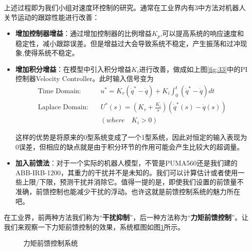 上述过程即为我们小组对速度环控制的研究。通常在工业界内有3中方法对机器人关节运动的跟踪性能进行改善：

\begin{itemize}
    \item \textbf{增加控制器增益}：通过增加控制器的比例增益$K_p$,可以提高系统的响应速度和稳定性，减小跟踪误差。但是增益过大会导致系统不稳定，产生振荡和过冲现象,使得系统不稳定。
    \item \textbf{增加积分增益}：在模型中引入积分增益$K_i$进行改善，做成如上图\ref{fig:33}中的PI控制器Velocity Controller。此时输入信号变为
    \begin{equation}
        \begin{aligned}
           \text{Time Domain:}\quad &u^*=K_v(\dot{q}^*-\dot{q})+K_i\int_{0}^{t}(\dot{q}^*-\dot{q})dt\\
           \text{Laplace Domain:}\quad  &U^*(s)=(K_v+\frac{K_i}{s})(\dot{q}^*(s)-\dot{q}(s))\\
           & (where \quad K_i>0)
        \end{aligned}
    \end{equation}

    这样的优势是将原来的0型系统变成了一个1型系统，因此对恒定的输入表现为0误差，但相应的缺点就是由于积分环节的作用可能会产生比较大的超调量。
    \item \textbf{加入前馈法}：对于一个实际的机器人模型，不管是PUMA560还是我们建的ABB-IRB-1200，其重力的干扰并不是未知的。我们可以计算估计或者使用一些上限/下限，预测干扰并消除它。值得一提的是，即使我们设置的前馈量不准确，前馈控制也能减少干扰的浮动。\textcolor{cherry}{也许这就是前馈控制系统的魅力所在吧。}
\end{itemize}

在工业界，前两种方法我们称为“\textbf{干扰抑制}”，后一种方法称为“\textbf{力矩前馈控制}”。让我们来观察一下力矩前馈控制的效果，系统框图如图\ref{fig:37}所示。

\begin{figure}[htbp]
    \centering
    \caption{力矩前馈控制系统}
    \label{fig:37}
\end{figure}

